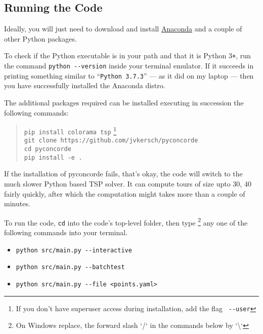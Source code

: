 \begin{appendices}
\renewcommand{\thesection}{\Roman{section}\;\;}
\section{Running the Code}

Ideally, you will just need to download and install \href{https://www.anaconda.com/products/individual}{Anaconda} and a couple of other Python packages.  

To check if the Python executable is in your path and that it is Python 3\texttt{+}, run the command \verb|python --version| 
inside your terminal emulator. If it succeeds in printing something similar to ``\verb|Python 3.7.3|'' --- as it did on my laptop --- then 
you have successfully installed the Anaconda distro. 

The additional packages required can be installed executing in succession the following commands:
\begin{quote}
\color{blue}

\texttt{pip install colorama tsp} \footnote{If you don't have superuser access during installation, add the flag \texttt{\color{red} \texttt{-{}-}user}}   \\
\texttt{git clone https://github.com/jvkersch/pyconcorde} \\
\texttt{cd pyconcorde}\\
\texttt{pip install -e .}
\end{quote}

If the installation of pyconcorde fails, that's okay, the code will switch to the much slower Python based TSP solver. It can compute tours
of size upto 30, 40 fairly quickly, after which the computation might takes more than a couple of minutes.  

To run the code, \texttt{cd} into the code's top-level folder, then type \footnote{On Windows replace, the forward slash `/` in the commands below by `\textbackslash`}
any one of the following commands into your terminal. 

\begin{itemize}
\item \verb|python src/main.py --interactive|
\item \verb|python src/main.py --batchtest|
\item \verb|python src/main.py --file <points.yaml>|
\end{itemize}


\end{appendices}
